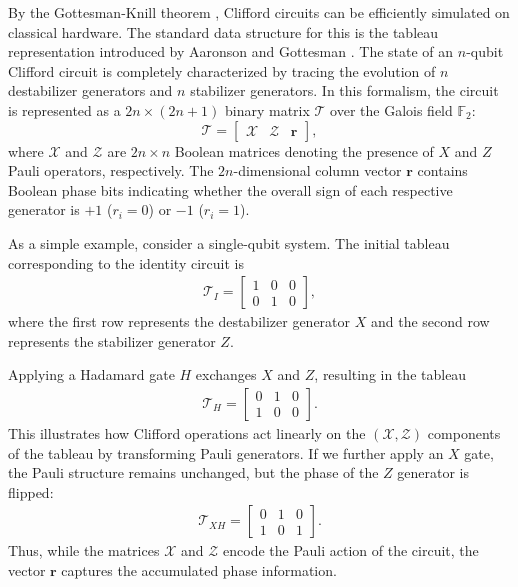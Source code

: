 \documentclass[conference]{IEEEtran}
\begin{document}
By the Gottesman-Knill theorem \cite{Gottesman1997zz}, Clifford circuits can be efficiently simulated on classical hardware. The standard data structure for this is the tableau representation introduced by Aaronson and Gottesman \cite{AG_for_clifford}. 
The state of an $n$-qubit Clifford circuit is completely characterized by tracing the evolution of $n$ destabilizer generators and $n$ stabilizer generators. In this formalism, the circuit is represented as a $2n \times (2n+1)$ binary matrix $\mathcal{T}$ over the Galois field $\mathbb{F}_2$:
\begin{equation}
    \mathcal{T} = \left[ \begin{array}{cc|c}
    \mathcal{X} & \mathcal{Z} & \mathbf{r}
    \end{array} \right],
\end{equation}
where $\mathcal{X}$ and $\mathcal{Z}$ are $2n \times n$ Boolean matrices denoting the presence of $X$ and $Z$ Pauli operators, respectively. The $2n$-dimensional column vector $\mathbf{r}$ contains Boolean phase bits indicating whether the overall sign of each respective generator is $+1$ ($r_i=0$) or $-1$ ($r_i=1$).

As a simple example, consider a single-qubit system. The initial tableau corresponding to the identity circuit is
\begin{align*}
\mathcal{T}_I = 
\left[
\begin{array}{cc|c}
1 & 0 & 0 \\
0 & 1 & 0
\end{array}
\right],
\end{align*}
where the first row represents the destabilizer generator $X$ and the second row represents the stabilizer generator $Z$.

Applying a Hadamard gate $H$ exchanges $X$ and $Z$, resulting in the tableau
\begin{align*}
\mathcal{T}_H = 
\left[
\begin{array}{cc|c}
0 & 1 & 0 \\
1 & 0 & 0
\end{array}
\right].
\end{align*}
This illustrates how Clifford operations act linearly on the $(\mathcal{X}, \mathcal{Z})$ components of the tableau by transforming Pauli generators.
If we further apply an $X$ gate, the Pauli structure remains unchanged, but the phase of the $Z$ generator is flipped:
\begin{align*}
\mathcal{T}_{XH} = 
\left[
\begin{array}{cc|c}
0 & 1 & 0 \\
1 & 0 & 1
\end{array}
\right].
\end{align*}
Thus, while the matrices $\mathcal{X}$ and $\mathcal{Z}$ encode the Pauli action of the circuit, the vector $\mathbf{r}$ captures the accumulated phase information.
\end{document}
